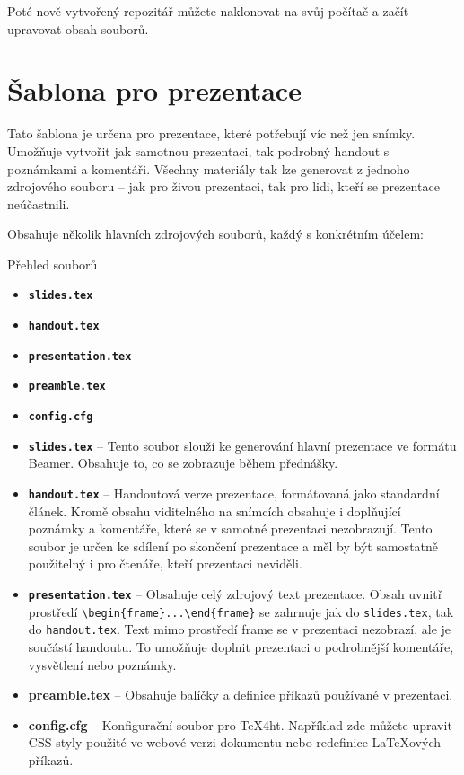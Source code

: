 Poté nově vytvořený repozitář můžete naklonovat na svůj počítač a začít upravovat 
obsah souborů. 
\section{Šablona pro prezentace}

Tato šablona je určena pro prezentace, které potřebují víc než jen snímky. Umožňuje vytvořit jak samotnou prezentaci, tak podrobný handout s poznámkami a komentáři. Všechny materiály tak lze generovat z jednoho zdrojového souboru – jak pro živou prezentaci, tak pro lidi, kteří se prezentace neúčastnili.

Obsahuje několik hlavních zdrojových souborů, každý s konkrétním účelem:

\begin{frame}[fragile]{Přehled souborů}
\begin{itemize}
\item \textbf{\texttt{slides.tex}}
\item \textbf{\texttt{handout.tex}}
\item \textbf{\texttt{presentation.tex}}
\item \textbf{\texttt{preamble.tex}}
\item \textbf{\texttt{config.cfg}}
\end{itemize}
\end{frame}

\begin{itemize}
\item \textbf{\texttt{slides.tex}} – Tento soubor slouží ke generování hlavní prezentace ve formátu Beamer. Obsahuje to, co se zobrazuje během přednášky.

\item \textbf{\texttt{handout.tex}} – Handoutová verze prezentace, formátovaná jako standardní článek. Kromě obsahu viditelného na snímcích obsahuje i doplňující poznámky a komentáře, které se v samotné prezentaci nezobrazují. Tento soubor je určen ke sdílení po skončení prezentace a měl by být samostatně použitelný i pro čtenáře, kteří prezentaci neviděli.

\item \textbf{\texttt{presentation.tex}} – Obsahuje celý zdrojový text prezentace. Obsah uvnitř prostředí \verb|\begin{frame}...\end{frame}| se zahrnuje jak do \texttt{slides.tex}, tak do \texttt{handout.tex}. Text mimo prostředí frame se v prezentaci nezobrazí, ale je součástí handoutu. To umožňuje doplnit prezentaci o podrobnější komentáře, vysvětlení nebo poznámky.

\item \textbf{preamble.tex} – Obsahuje balíčky a definice příkazů používané v prezentaci.

\item \textbf{config.cfg} – Konfigurační soubor pro \TeX4ht. Například zde můžete upravit CSS styly použité ve webové verzi dokumentu nebo redefinice \LaTeX{}ových příkazů.
\end{itemize}

